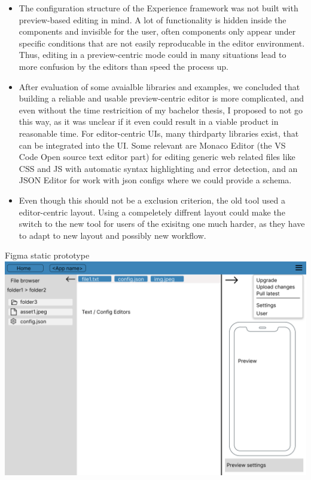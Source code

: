 \begin{itemize}
  \item The configuration structure of the Experience framework was not built with preview-based editing in mind. A lot of functionality is hidden inside the components and invisible for the user,
  often components only appear under specific conditions that are not easily reproducable in the editor environment. Thus, editing in a preview-centric mode could in many situations
  lead to more confusion by the editors than speed the process up.
  \item After evaluation of some avaialble libraries and examples, we concluded that building a reliable and usable preview-centric editor is more complicated, and even without the time restricition of my bachelor thesis, I proposed to not go this way,
  as it was unclear if it even could result in a viable product in reasonable time. For editor-centric UIs, many thirdparty libraries exist, that can be integrated into the UI.
  Some relevant are Monaco Editor (the VS Code Open source text editor part) for editing generic web related files like CSS and JS with automatic syntax highlighting and error detection, and an JSON Editor for work with json configs where we could provide a schema.
  \item Even though this should not be a exclusion criterion, the old tool used a editor-centric layout. Using a compeletely diffrent layout could make the switch to the new tool for users
  of the exisitng one much harder, as they have to adapt to new layout and possibly new workflow.

\end{itemize}

Figma static prototype
\\
\includegraphics[width=\textwidth]{pics/figma-desktop.png}